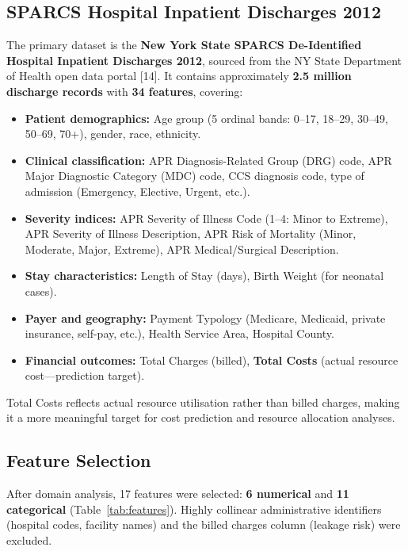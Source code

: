 \documentclass[11pt,a4paper]{article}
\begin{document}
\subsection{SPARCS Hospital Inpatient Discharges 2012}
The primary dataset is the \textbf{New York State SPARCS De-Identified Hospital Inpatient Discharges 2012}, sourced from the NY State Department of Health open data portal [14]. It contains approximately \textbf{2.5 million discharge records} with \textbf{34 features}, covering:
\begin{itemize}
  \item \textbf{Patient demographics:} Age group (5 ordinal bands: 0--17, 18--29, 30--49, 50--69, 70+), gender, race, ethnicity.
  \item \textbf{Clinical classification:} APR Diagnosis-Related Group (DRG) code, APR Major Diagnostic Category (MDC) code, CCS diagnosis code, type of admission (Emergency, Elective, Urgent, etc.).
  \item \textbf{Severity indices:} APR Severity of Illness Code (1--4: Minor to Extreme), APR Severity of Illness Description, APR Risk of Mortality (Minor, Moderate, Major, Extreme), APR Medical/Surgical Description.
  \item \textbf{Stay characteristics:} Length of Stay (days), Birth Weight (for neonatal cases).
  \item \textbf{Payer and geography:} Payment Typology (Medicare, Medicaid, private insurance, self-pay, etc.), Health Service Area, Hospital County.
  \item \textbf{Financial outcomes:} Total Charges (billed), \textbf{Total Costs} (actual resource cost---prediction target).
\end{itemize}

Total Costs reflects actual resource utilisation rather than billed charges, making it a more meaningful target for cost prediction and resource allocation analyses.

\subsection{Feature Selection}
After domain analysis, 17 features were selected: \textbf{6 numerical} and \textbf{11 categorical} (Table~\ref{tab:features}). Highly collinear administrative identifiers (hospital codes, facility names) and the billed charges column (leakage risk) were excluded.
\end{document}
